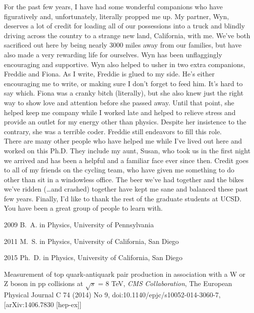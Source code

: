 \begin{frontmatter}
\begin{acknowledgements}
For the past few years, I have had some wonderful companions who have figuratively and, unfortunately, literally propped me up. My partner, Wyn, deserves a lot of credit for loading all of our possessions into a truck and blindly driving across the country to a strange new land, California, with me. We've both sacrificed out here by being nearly 3000 miles away from our families, but have also made a very rewarding life for ourselves. Wyn has been unflaggingly encouraging and supportive. Wyn also helped to usher in two extra companions, Freddie and Fiona. As I write, Freddie is glued to my side. He's either encouraging me to write, or making sure I don't forget to feed him. It's hard to say which. Fiona was a cranky bitch (literally), but she also knew just the right way to show love and attention before she passed away. Until that point, she helped keep me company while I worked late and helped to relieve stress and provide an outlet for my energy other than physics. Despite her insistence to the contrary, she was a terrible coder. Freddie still endeavors to fill this role.\\

There are many other people who have helped me while I've lived out here and worked on this Ph.D. They include my aunt, Susan, who took us in the first night we arrived and has been a helpful and a familiar face ever since then. Credit goes to all of my friends on the cycling team, who have given me something to do other than sit in a windowless office. The beer we've had together and the bikes we've ridden (\ldots and crashed) together have kept me sane and balanced these past few years. Finally, I'd like to thank the rest of the graduate students at UCSD. You have been a great group of people to learn with.\\

\end{acknowledgements}                                                         

\begin{vitapage}                                                               
\begin{vita}                                                                   
  \item[2009] B.~A. in Physics, University of Pennsylvania
  \item[2011] M.~S. in Physics, University of California, San Diego
  \item[2015] Ph.~D. in Physics, University of California, San Diego       
\end{vita}                                                                     
\begin{publications}                                                           
 \item Measurement of top quark-antiquark pair production in association with a W or Z boson in pp collisions at $\sqrt{s}$ = 8 TeV, {\it CMS Collaboration}, The European Physical Journal C 74 (2014) No 9, doi:10.1140/epjc/s10052-014-3060-7, [arXiv:1406.7830 [hep-ex]]



\end{publications}
\end{vitapage}
\end{frontmatter}
